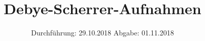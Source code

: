 


\subject{Versuch Nr.48}
\title{Debye-Scherrer-Aufnahmen}
\date{
  Durchführung: 29.10.2018
  \hspace{3em}
  Abgabe: 01.11.2018
}




\maketitle
\thispagestyle{plain}
\tableofcontents
\newpage



\newpage

\newpage

\newpage

\newpage

\printbibliography
\newpage
% 


